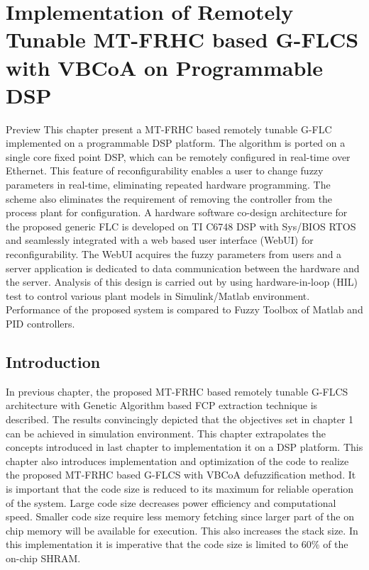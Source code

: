 \chapter{Implementation of Remotely Tunable MT-FRHC based G-FLCS with VBCoA on Programmable DSP}

\begin{chapterAbstract}{Preview}
	This chapter present a MT-FRHC based remotely tunable G\hyp{}FLC implemented on a programmable DSP platform. The algorithm is ported on a single core fixed point DSP, which can be remotely configured in real\hyp{}time over Ethernet. This feature of reconfigurability enables a user to change fuzzy parameters in real\hyp{}time, eliminating repeated hardware programming. The scheme also eliminates the requirement of removing the controller from the process plant for configuration. A hardware software co\hyp{}design architecture for the proposed generic FLC is developed on TI C6748 DSP with Sys/BIOS RTOS and seamlessly integrated with a web based user interface (WebUI) for reconfigurability. The WebUI acquires the fuzzy parameters from users and a server application is dedicated to data communication between the hardware and the server. Analysis of this design is carried out by using hardware\hyp{}in\hyp{}loop (HIL) test to control various plant models in Simulink/Matlab environment. Performance of the proposed system is compared to Fuzzy Toolbox of Matlab and PID controllers.
\end{chapterAbstract}
\clearpage

\section{Introduction}
In previous chapter, the proposed MT-FRHC based remotely tunable G-FLCS architecture with Genetic Algorithm based FCP extraction technique is described. The results convincingly depicted that the objectives set in chapter 1 can be achieved in simulation environment. This chapter extrapolates the concepts introduced in last chapter to implementation it on a DSP platform. This chapter also introduces implementation and optimization of the code to realize the proposed MT-FRHC based G-FLCS with VBCoA defuzzification method. It is important that the code size is reduced to its maximum for reliable operation of the system. Large code size decreases power efficiency and computational speed. Smaller code size require less memory fetching since larger part of the on chip memory will be available for execution. This also increases the stack size. In this implementation it is imperative that the code size is limited to 60\% of the on-chip SHRAM.

